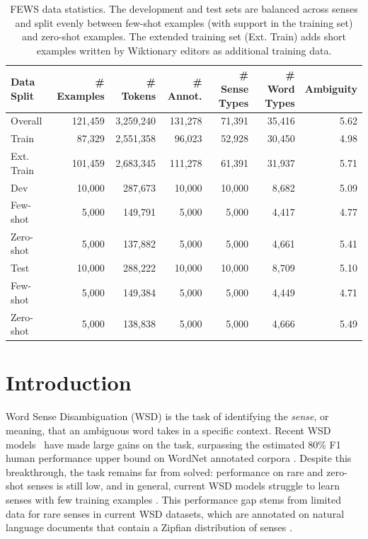 \documentclass[11pt,a4paper]{article}
\begin{document}
\begin{table}[t]
    \centering
    \small
    \begin{tabularx}{0.85\textwidth}{l | r r r r r r} 
    \toprule
    \textbf{Data Split} & \textbf{\# Examples}& \textbf{\# Tokens} & \textbf{\# Annot.} & \textbf{\# Sense Types} & \textbf{\# Word Types} & \textbf{Ambiguity} \\
    \hline 
    Overall & 121,459 & 3,259,240 & 131,278 & 71,391 & 35,416 & 5.62 \\
    \hline
    Train & 87,329 & 2,551,358 & 96,023 & 52,928 & 30,450 & 4.98 \\
    Ext. Train & 101,459 & 2,683,345 & 111,278 & 61,391 & 31,937 & 5.71 \\
    \hline
    Dev & 10,000 & 287,673 & 10,000 & 10,000 & 8,682 & 5.09 \\
    \hspace{3mm}Few-shot & 5,000 & 149,791 & 5,000 & 5,000 & 4,417 & 4.77 \\
    \hspace{3mm}Zero-shot & 5,000 & 137,882 & 5,000 & 5,000 & 4,661 & 5.41 \\
    \hline
    Test & 10,000 & 288,222 & 10,000 & 10,000 & 8,709 & 5.10 \\
    \hspace{3mm}Few-shot & 5,000 & 149,384 & 5,000 & 5,000 & 4,449 & 4.71 \\
    \hspace{3mm}Zero-shot & 5,000 & 138,838 & 5,000 & 5,000 & 4,666 & 5.49 \\
    \toprule
    \end{tabularx}
    \caption{FEWS data statistics. The development and test sets are balanced across senses and split evenly between few-shot examples (with support in the training set) and zero-shot examples. The extended training set (Ext. Train) adds short examples written by Wiktionary editors as additional training data.}
    \label{data-stats-table}
\end{table}

\section{Introduction}
Word Sense Disambiguation (WSD) is the task of identifying the \textit{sense}, or meaning, that an ambiguous word takes in a specific context. Recent WSD models~\cite{huang2019glossbert, blevins2020moving, bevilacqua2020breaking} have made large gains on the task, surpassing the estimated 80\% F1 human performance upper bound on WordNet annotated corpora \cite{navigli2009word}.
Despite this breakthrough, the task remains far from solved: performance on rare and zero-shot senses is still low, and in general, current WSD models struggle to learn senses with few training examples \cite{kumar2019zero, blevins2020moving}. This performance gap stems from limited data for rare senses in current WSD datasets, which are annotated on natural language documents that contain a Zipfian distribution of senses \cite{postma2016more}. 
\end{document}
